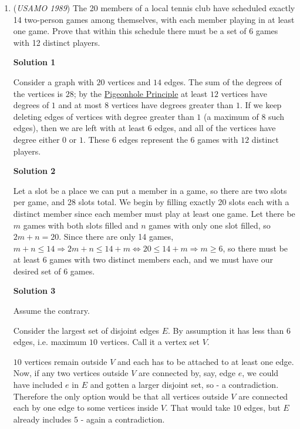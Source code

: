 \begin{enumerate}
	\item (\textit{USAMO 1989}) The 20 members of a local tennis club have scheduled exactly 14 two-person games among themselves, with each member playing in at least one game. Prove that within this schedule there must be a set of 6 games with 12 distinct players.


 



\textbf{Solution 1}

Consider a graph with $20$ vertices and $14$ edges. The sum of the degrees of the vertices is $28$; by the \href{https://artofproblemsolving.com/wiki/index.php?title=Pigeonhole\_Principle}{Pigeonhole Principle} at least $12$ vertices have degrees of $1$ and at most $8$ vertices have degrees greater than $1$. If we keep deleting edges of vertices with degree greater than $1$ (a maximum of $8$ such edges), then we are left with at least $6$ edges, and all of the vertices have degree either $0$ or $1$. These $6$ edges represent the $6$ games with $12$ distinct players.

 



\textbf{Solution 2}

Let a slot be a place we can put a member in a game, so there are two slots per game, and 28 slots total.  We begin by filling exactly 20 slots each with a distinct member since each member must play at least one game.  Let there be $m$ games with both slots filled and $n$ games with only one slot filled, so $2m+n=20$.  Since there are only 14 games, $m+n \leq 14 \Longrightarrow 2m+n \leq 14+m \Longleftrightarrow 20 \leq 14+m \Longrightarrow m \geq 6$, so there must be at least 6 games with two distinct members each, and we must have our desired set of 6 games.

 



\textbf{Solution 3}

Assume the contrary. 

 Consider the largest set of disjoint edges $E$. By assumption it has less than $6$ edges, i.e. maximum $10$ vertices. Call it a vertex set $V$. 

 $10$ vertices remain outside $V$ and each has to be attached to at least one edge. Now, if any two vertices outside $V$ are connected by, say, edge $e$, we could have included $e$ in $E$ and gotten a larger disjoint set, so - a contradiction. Therefore the only option would be that all vertices outside $V$ are connected each by one edge to some vertices inside $V$. That would take $10$ edges, but $E$ already includes $5$ - again a contradiction. 


\end{enumerate}
